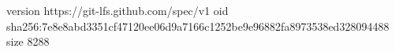 version https://git-lfs.github.com/spec/v1
oid sha256:7e8e8abd3351cf47120ee06d9a7166c1252be9e96882fa8973538ed328094488
size 8288
